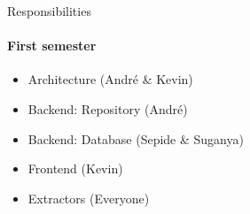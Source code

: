 \begin{frame}{Responsibilities}
\framesubtitle{First semester}
	\begin{itemize}
		\item Architecture (André \& Kevin)
		\item Backend: Repository (André)
		\item Backend: Database (Sepide \& Suganya)
		\item Frontend (Kevin)
		\item Extractors (Everyone)
	\end{itemize}
\end{frame}